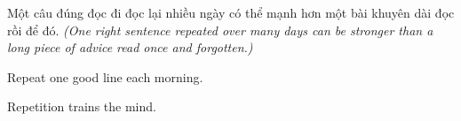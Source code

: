\begin{baihoc}
Một câu đúng đọc đi đọc lại nhiều ngày có thể mạnh hơn một bài khuyên dài đọc rồi để đó.
\textit{(One right sentence repeated over many days can be stronger than a long piece of advice read once and forgotten.)}
\end{baihoc}

\begin{ghinhoanh}
Repeat one good line each morning.

Repetition trains the mind.
\end{ghinhoanh}

\ngancach